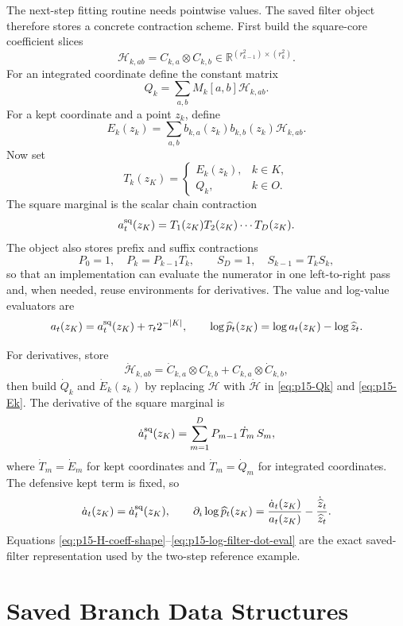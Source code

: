 \documentclass[11pt]{article}
\newcommand{\R}{\mathbb{R}}
\theoremstyle{definition}
\theoremstyle{remark}
\renewcommand{\[}{\begin{equation}}
\renewcommand{\]}{\end{equation}}
\begin{document}
The next-step fitting routine needs pointwise values.  The saved filter object
therefore stores a concrete contraction scheme.  First build the square-core
coefficient slices
\[
  \mathcal H_{k,ab}=C_{k,a}\otimes C_{k,b}
  \in\R^{(r_{k-1}^2)\times(r_k^2)}.
  \label{eq:p15-H-coeff-shape}
\]
For an integrated coordinate define the constant matrix
\[
  Q_k=\sum_{a,b}M_k[a,b]\mathcal H_{k,ab}.
  \label{eq:p15-Qk}
\]
For a kept coordinate and a point \(z_k\), define
\[
  E_k(z_k)=\sum_{a,b}b_{k,a}(z_k)b_{k,b}(z_k)\mathcal H_{k,ab}.
  \label{eq:p15-Ek}
\]
Now set
\[
  T_k(z_K)=
  \begin{cases}
    E_k(z_k), & k\in K,\\
    Q_k, & k\in O.
  \end{cases}
  \label{eq:p15-Tk}
\]
The square marginal is the scalar chain contraction
\[
  a_t^{\rm sq}(z_K)=T_1(z_K)T_2(z_K)\cdots T_D(z_K).
  \label{eq:p15-a-sq-chain}
\]
The object also stores prefix and suffix contractions
\[
  P_0=1,\quad P_k=P_{k-1}T_k,
  \qquad
  S_D=1,\quad S_{k-1}=T_kS_k,
  \label{eq:p15-prefix-suffix}
\]
so that an implementation can evaluate the numerator in one left-to-right
pass and, when needed, reuse environments for derivatives.  The value and
log-value evaluators are
\[
  a_t(z_K)=a_t^{\rm sq}(z_K)+\tau_t2^{-|K|},
  \qquad
  \log\widehat p_t(z_K)=\log a_t(z_K)-\log\widehat z_t.
  \label{eq:p15-log-filter-eval}
\]

For derivatives, store
\[
  \dot{\mathcal H}_{k,ab}
  =
  \dot C_{k,a}\otimes C_{k,b}
  +
  C_{k,a}\otimes \dot C_{k,b},
  \label{eq:p15-Hcoeff-dot}
\]
then build \(\dot Q_k\) and \(\dot E_k(z_k)\) by replacing
\(\mathcal H\) with \(\dot{\mathcal H}\) in \eqref{eq:p15-Qk} and
\eqref{eq:p15-Ek}.  The derivative of the square marginal is
\[
  \dot a_t^{\rm sq}(z_K)
  =
  \sum_{m=1}^D
  P_{m-1}\,\dot T_m\,S_m,
  \label{eq:p15-adot-chain}
\]
where \(\dot T_m=\dot E_m\) for kept coordinates and \(\dot T_m=\dot Q_m\)
for integrated coordinates.  The defensive kept term is fixed, so
\[
  \dot a_t(z_K)=\dot a_t^{\rm sq}(z_K),
  \qquad
  \partial_i\log\widehat p_t(z_K)
  =
  \frac{\dot a_t(z_K)}{a_t(z_K)}
  -
  \frac{\dot{\widehat z}_t}{\widehat z_t}.
  \label{eq:p15-log-filter-dot-eval}
\]
Equations \eqref{eq:p15-H-coeff-shape}--\eqref{eq:p15-log-filter-dot-eval}
are the exact saved-filter representation used by the two-step reference
example.

\section{Saved Branch Data Structures}
\end{document}
